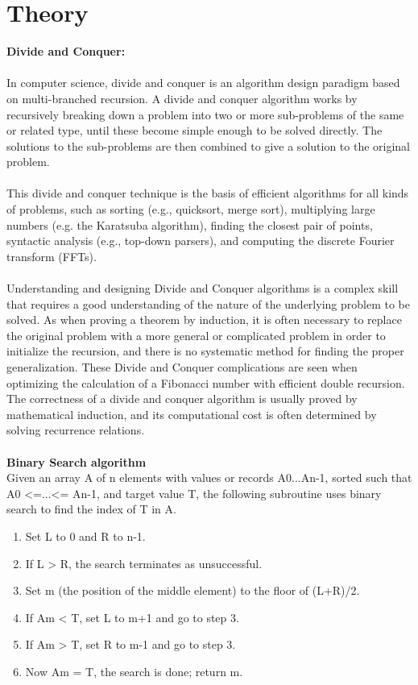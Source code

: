 \documentclass{article}
\begin{document}
\section{Theory}
\textbf{Divide and Conquer:}
\\\\
In computer science, divide and conquer is an algorithm design paradigm based on multi-branched recursion. A divide and conquer algorithm works by recursively breaking down a problem into two or more sub-problems of the same or related type, until these become simple enough to be solved directly. The solutions to the sub-problems are then combined to give a solution to the original problem.
\\\\This divide and conquer technique is the basis of efficient algorithms for all kinds of problems, such as sorting (e.g., quicksort, merge sort), multiplying large numbers (e.g. the Karatsuba algorithm), finding the closest pair of points, syntactic analysis (e.g., top-down parsers), and computing the discrete Fourier transform (FFTs).
\\\\Understanding and designing Divide and Conquer algorithms is a complex skill that requires a good understanding of the nature of the underlying problem to be solved. As when proving a theorem by induction, it is often necessary to replace the original problem with a more general or complicated problem in order to initialize the recursion, and there is no systematic method for finding the proper generalization. These Divide and Conquer complications are seen when optimizing the calculation of a Fibonacci number with efficient double recursion.
\\The correctness of a divide and conquer algorithm is usually proved by mathematical induction, and its computational cost is often determined by solving recurrence relations.
\\\\
\textbf{Binary Search algorithm}
\\Given an array A of n elements with values or records A0...An-1, sorted such that A0 <=...<= An-1, and target value T, the following subroutine uses binary search to find the index of T in A.
\\
\begin{enumerate}
\item Set L to 0 and R to n-1.
\item If L > R, the search terminates as unsuccessful.
\item Set m (the position of the middle element) to the floor of (L+R)/2.
\item If Am < T, set L to m+1 and go to step 3.
\item If Am > T, set R to m-1 and go to step 3.
\item Now Am = T, the search is done; return m.
\end{enumerate}
    
\end{document}
